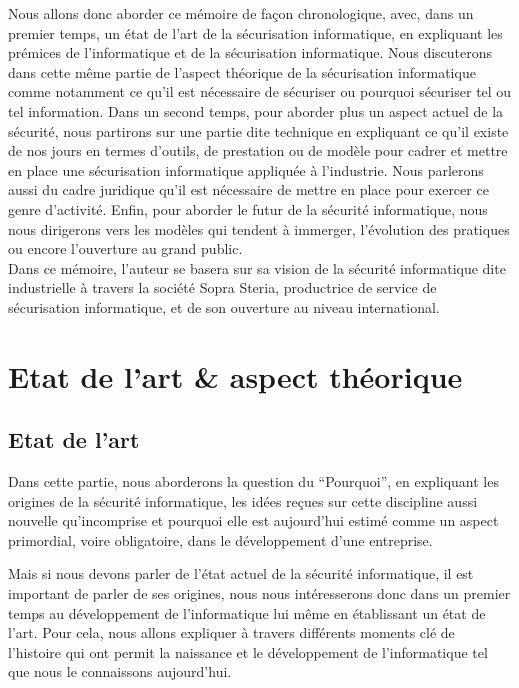 \documentclass[a4paper]{memoir}
\begin{document}
Nous allons donc aborder ce mémoire de façon chronologique, avec, dans un premier temps, un état de l'art de la sécurisation informatique, en expliquant les prémices de l'informatique et de la sécurisation informatique. Nous discuterons dans cette même partie de l'aspect théorique de la sécurisation informatique comme notamment ce qu'il est nécessaire de sécuriser ou pourquoi sécuriser tel ou tel information.
Dans un second temps, pour aborder plus un aspect actuel de la sécurité, nous partirons sur une partie dite technique en expliquant ce qu'il existe de nos jours en termes d'outils, de prestation ou de modèle pour cadrer et mettre en place une sécurisation informatique appliquée à l'industrie. Nous parlerons aussi du cadre juridique qu'il est nécessaire de mettre en place pour exercer ce genre d'activité. Enfin, pour aborder le futur de la sécurité informatique, nous nous dirigerons vers les modèles qui tendent à immerger, l'évolution des pratiques ou encore l'ouverture au grand public.\\

Dans ce mémoire, l'auteur se basera sur sa vision de la sécurité informatique dite industrielle à travers la société Sopra Steria, productrice de service de sécurisation informatique, et de son ouverture au niveau international.



\part{Etat de l'art \& aspect théorique}


\chapter{Etat de l'art}%

Dans cette partie, nous aborderons la question du ``Pourquoi'', en expliquant les origines de la sécurité informatique, les idées reçues sur cette discipline aussi nouvelle qu'incomprise et pourquoi elle est aujourd'hui estimé comme un aspect primordial, voire obligatoire, dans le développement d'une entreprise.

\noindent Mais si nous devons parler de l'état actuel de la sécurité informatique, il est important de parler de ses origines, nous nous intéresserons donc dans un premier temps au développement de l'informatique lui même en établissant un état de l'art. Pour cela, nous allons expliquer à travers différents moments clé de l'histoire qui ont permit la naissance et le développement de l'informatique tel que nous le connaissons aujourd'hui.\\
\end{document}
